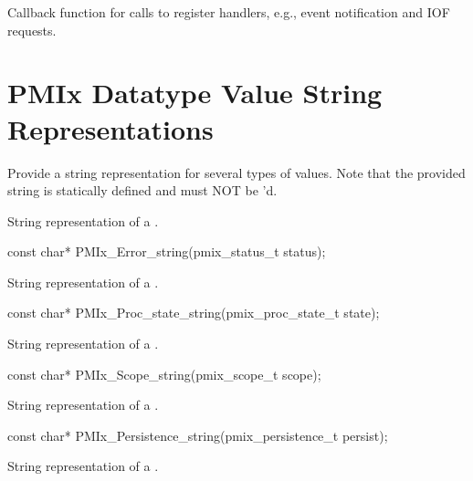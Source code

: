 Callback function for calls to register handlers, e.g., event notification and IOF requests.


\section{PMIx Datatype Value String Representations}

Provide a string representation for several types of values.
Note that the provided string is statically defined and must NOT be 'd.

\summary
{}

String representation of a .

\cspecificstart
\begin{codepar}
const char*
PMIx_Error_string(pmix_status_t status);
\end{codepar}
\cspecificend

\summary
{}

String representation of a .

\cspecificstart
\begin{codepar}
const char*
PMIx_Proc_state_string(pmix_proc_state_t state);
\end{codepar}
\cspecificend

\summary
{}

String representation of a .

\cspecificstart
\begin{codepar}
const char*
PMIx_Scope_string(pmix_scope_t scope);
\end{codepar}
\cspecificend

\summary
{}

String representation of a .

\cspecificstart
\begin{codepar}
const char*
PMIx_Persistence_string(pmix_persistence_t persist);
\end{codepar}
\cspecificend

\summary
{}

String representation of a .

